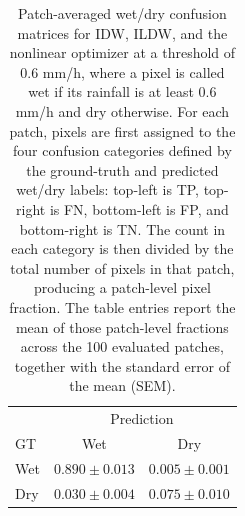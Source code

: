 \documentclass[11pt]{article}
\begin{document}
\begin{table}[H]
\begin{minipage}[t]{0.31\textwidth}
    \vspace{0.35em}
    \scriptsize
    \begin{tabular}{lcc}
      \toprule
       & \multicolumn{2}{c}{Prediction} \\
      GT & Wet & Dry \\
      \midrule
      Wet & $0.890 \pm 0.013$ & $0.005 \pm 0.001$ \\
      Dry & $0.030 \pm 0.004$ & $0.075 \pm 0.010$ \\
      \bottomrule
    \end{tabular}
  \end{minipage}
  \caption{Patch-averaged wet/dry confusion matrices for IDW, ILDW, and the nonlinear optimizer at a threshold of $0.6$ mm/h, where a pixel is called wet if its rainfall is at least $0.6$ mm/h and dry otherwise. For each patch, pixels are first assigned to the four confusion categories defined by the ground-truth and predicted wet/dry labels: top-left is TP, top-right is FN, bottom-left is FP, and bottom-right is TN. The count in each category is then divided by the total number of pixels in that patch, producing a patch-level pixel fraction. The table entries report the mean of those patch-level fractions across the 100 evaluated patches, together with the standard error of the mean (SEM).}
\end{table}




\end{document}
